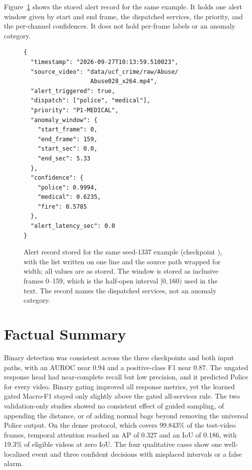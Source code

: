Figure~\ref{fig:results-cad-json} shows the stored alert record for the same example. It holds one alert window given by start and end frame, the dispatched services, the priority, and the per-channel confidences. It does not hold per-frame labels or an anomaly category.

\begin{figure}[tbp]
    \centering
    \begin{minipage}{0.75\textwidth}
\begin{lstlisting}[basicstyle=\ttfamily\footnotesize]
{
  "timestamp": "2026-09-27T10:13:59.510023",
  "source_video": "data/ucf_crime/raw/Abuse/
                   Abuse028_x264.mp4",
  "alert_triggered": true,
  "dispatch": ["police", "medical"],
  "priority": "P1-MEDICAL",
  "anomaly_window": {
    "start_frame": 0,
    "end_frame": 159,
    "start_sec": 0.0,
    "end_sec": 5.33
  },
  "confidence": {
    "police": 0.9994,
    "medical": 0.6235,
    "fire": 0.5785
  },
  "alert_latency_sec": 0.0
}
\end{lstlisting}
    \end{minipage}
    \caption[Stored alert record for the CAD-style example.]{Alert record stored for the same  seed-1337 example (checkpoint ), with the  list written on one line and the source path wrapped for width; all values are as stored. The window is stored as inclusive frames 0--159, which is the half-open interval $[0,160)$ used in the text. The record names the dispatched services, not an anomaly category.}
    \label{fig:results-cad-json}
\end{figure}

\section{Factual Summary}
\label{sec:results-summary}

Binary detection was consistent across the three checkpoints and both input paths, with an AUROC near 0.94 and a positive-class F1 near 0.87. The ungated response head had near-complete recall but low precision, and it predicted Police for every video. Binary gating improved all response metrics, yet the learned gated Macro-F1 stayed only slightly above the gated all-services rule. The two validation-only studies showed no consistent effect of guided sampling, of appending the distance, or of adding normal bags beyond removing the universal Police output. On the dense protocol, which covers 99.843\% of the test-video frames, temporal attention reached an AP of 0.327 and an IoU of 0.186, with 19.3\% of eligible videos at zero IoU. The four qualitative cases show one well-localized event and three confident decisions with misplaced intervals or a false alarm.
